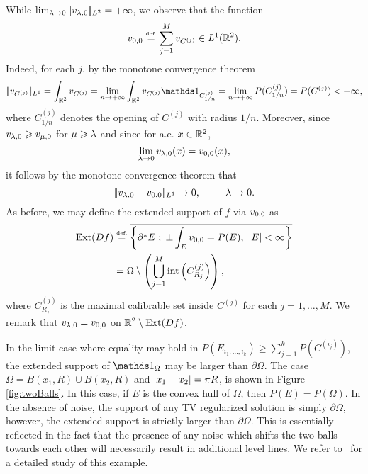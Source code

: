 While $\lim_{\lambda\to 0}|\!| v_{\lambda,0} |\!|_{L^2} = +\infty$, we observe that the function $$v_{0,0} \stackrel{\mbox{\upshape\tiny def.}}{=} \sum_{j=1}^M v_{C^{(j)}}\in L^1(\mathbb{R}^2).$$ Indeed, for each $j$, by the monotone convergence theorem
\begin{equation*}
\normLun{ v_{C^{(j)}}} = \int_{\RR^2} v_{C^{(j)}} =\lim_{n\to+\infty} \int_{\RR^2} v_{C^{(j)}}\bun{C^{(j)}_{1/n} } = \lim_{n\to+\infty}P(C^{(j)}_{1/n})=P(C^{(j)})<+\infty,
\end{equation*}
where $C^{(j)}_{1/n}$ denotes the opening of $C^{(j)}$ with radius $1/n$.
Moreover, since $v_{\lambda,0}\geqslant v_{\mu,0}$ for $\mu\geqslant\lambda$ and since for a.e. $x\in \mathbb{R}^2$,
$$
\lim_{\lambda\to 0}v_{\lambda,0}(x) = v_{0,0}(x),
$$
it follows by the monotone convergence theorem that
\begin{equation*}
|\!| v_{\lambda,0} - v_{0,0} |\!|_{L^1}\to 0, \hspace*{25pt} \lambda\to 0.
\end{equation*}
 As before, we may define the extended support of $f$ via $v_{0,0}$ as
\begin{align}\label{eq:ext_spt_cvx_sets}
\begin{split}
  \operatorname{Ext}(Df)&\stackrel{\mbox{\upshape\tiny def.}}{=} \overline{\left\{ \partial^* E \;;\; \pm\int_E v_{0,0} = P(E),~ \left| E \right|<\infty \right\}}\\
& = \Omega\setminus \left(\bigcup_{j=1}^M \mathrm{int}\left(C^{(j)}_{R_j}\right)\right),
\end{split}
\end{align}
where $C^{(j)}_{R_j}$ is the maximal calibrable set inside $C^{(j)}$ for each $j=1,\ldots, M$. We remark that $v_{\lambda,0} = v_{0,0}$ on $\mathbb{R}^2 \setminus \operatorname{Ext}(Df)$.

\begin{rem}
In the limit case where equality may hold in $P(E_{i_1,\ldots, i_k}) \geq \sum_{j=1}^k P(C^{(i_j)})$, the extended support of $\bun{\Omega}$ may be larger than $\partial \Omega$. The case $\Omega = B(x_1,R)\cup B(x_2,R)$ and $\left| x_1 - x_2 \right| = \pi R$, is shown in Figure \ref{fig:twoBalls}. In this case, if $E$ is the convex hull of $\Omega$, then $P(E) = P(\Omega)$. In the absence of noise, the support of any TV regularized solution is simply $\partial \Omega$, however, the extended support is strictly larger than $\partial \Omega$. This is essentially reflected in the fact that the presence of any noise which shifts the two balls towards each other will necessarily result in additional level lines. We refer to~\cite{Allard3,caselles2012tv} for a detailed study of this example.
\end{rem}


